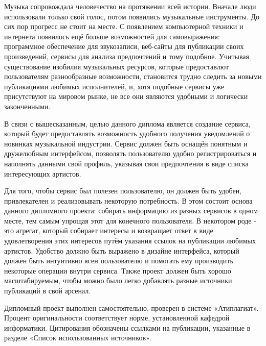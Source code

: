 \label{sec:intro}

Музыка сопровождала человечество на протяжении всей истории. Вначале люди использовали только свой голос, потом появились музыкальные инструменты. До сих пор прогресс не стоит на месте. С появлением компьютерной техники и интернета появилось ещё больше возможностей для самовыражения: программное обеспечение для звукозаписи, веб-сайты для публикации своих произведений, сервисы для анализа предпочтений и тому подобное. Учитывая существование изобилия музыкальных ресурсов, которые предоставлют пользователям разнообразные возможности, становится трудно следить за новыми публикациями любимых исполнителей, и, хотя подобные сервисы уже присутствуют на мировом рынке, не все они являются удобными и логически законченными.

В связи с вышесказанным, целью данного диплома является создание сервиса, который будет предоставлять возможность удобного получения уведомлений о новинках музыкальной индустрии. Сервис должен быть оснащён понятным и дружелюбным интерфейсом, позволять пользователю удобно регистрироваться и наполнять данными свой профиль, указывая свои предпочтения в виде списка интересующих артистов.

Для того, чтобы сервис был полезен пользователю, он должен быть удобен, привлекателен и реализовывать некоторую потребность. В этом состоит основа данного дипломного проекта: собирать информацию из разных сервисов в одном месте, тем самым упрощая этот для конечного пользователя. В некотором роде - это агрегат, который собирает интересы и возвращает ответ в виде удовлетворения этих интересов путём указания ссылок на публикации любимых артистов. Удобство должно быть выражено в дизайне интерфейса, который должен быть интуитивно ясен пользователю и помогать ему производить некоторые операции внутри сервиса. Также проект должен быть хорошо масштабируемым, чтобы можно было легко добавлять разные источники публикаций в свой арсенал.

Дипломный проект выполнен самостоятельно, проверен в системе «Атиплагиат». Процент оригинальности соответствует норме, установленной кафедрой информатики. Цитирования обозначены ссылками на публикации, указанные в разделе «Список использованных источников».
